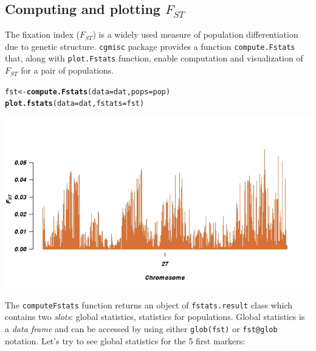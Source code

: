 \documentclass[12pt,a4paper,oneside]{article}\usepackage[]{graphicx}\usepackage[]{color}
\makeatletter
\newcommand{\hlstd}[1]{\textcolor[rgb]{0.345,0.345,0.345}{#1}}%
\newcommand{\hlkwb}[1]{\textcolor[rgb]{0.69,0.353,0.396}{#1}}%
\newcommand{\hlkwc}[1]{\textcolor[rgb]{0.333,0.667,0.333}{#1}}%
\newcommand{\hlkwd}[1]{\textcolor[rgb]{0.737,0.353,0.396}{\textbf{#1}}}%
\newenvironment{kframe}{%
 \def\at@end@of@kframe{}%
 \ifinner\ifhmode%
  \def\at@end@of@kframe{\end{minipage}}%
  \begin{minipage}{\columnwidth}%
 \fi\fi%
 \def\FrameCommand##1{\hskip\@totalleftmargin \hskip-\fboxsep
 \colorbox{shadecolor}{##1}\hskip-\fboxsep
     \hskip-\linewidth \hskip-\@totalleftmargin \hskip\columnwidth}%
 \MakeFramed {\advance\hsize-\width
   \@totalleftmargin\z@ \linewidth\hsize
   \@setminipage}}%
 {\par\unskip\endMakeFramed%
 \at@end@of@kframe}
\newenvironment{knitrout}{}{} %
\makeatother
\begin{document}
\subsection*{Computing and plotting $F_{ST}$}
The fixation index ($F_{ST}$) is a widely used measure of population differentiation due to genetic structure. \texttt{cgmisc} package provides a function \texttt{compute.Fstats} that, along with \texttt{plot.Fstats} function, enable computation and visualization of $F_{ST}$ for a pair of populations.
\begin{knitrout}\footnotesize
{}\color{fgcolor}\begin{kframe}
\begin{alltt}
\hlstd{fst} \hlkwb{<-} \hlkwd{compute.Fstats}\hlstd{(}\hlkwc{data} \hlstd{= dat,} \hlkwc{pops} \hlstd{= pop)}
\hlkwd{plot.fstats}\hlstd{(}\hlkwc{data} \hlstd{= dat,} \hlkwc{fstats} \hlstd{= fst)}
\end{alltt}
\end{kframe}

{\centering \includegraphics[width=1.0\textwidth]{images/fst} 

}



\end{knitrout}
The \texttt{computeFstats} function returns an object of \texttt{fstats.result} class which contains two \textit{slots}: global statistics, statistics for populations. Global statistics is a \textit{data frame} and can be accessed by using either \texttt{glob(fst)} or \texttt{fst@glob} notation. Let's try to see global statistics for the 5 first markers:
\end{document}
